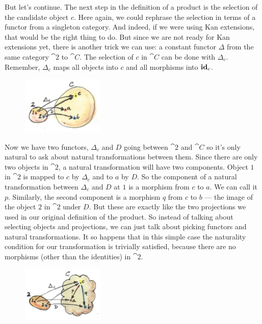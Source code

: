 \noindent
But let's continue. The next step in the definition of a product is the
selection of the candidate object $c$. Here again, we could
rephrase the selection in terms of a functor from a singleton category.
And indeed, if we were using Kan extensions, that would be the right
thing to do. But since we are not ready for Kan extensions yet, there is
another trick we can use: a constant functor $\Delta$ from the same category
$\cat{2}$ to $\cat{C}$. The selection of $c$ in $\cat{C}$ can be
done with $\Delta_c$. Remember, $\Delta_c$ maps all
objects into $c$ and all morphisms into $\idarrow[c]$.

\begin{figure}[H]
\centering
\includegraphics[width=0.35\textwidth]{images/twodelta.jpg}
\end{figure}

\noindent
Now we have two functors, $\Delta_c$ and $D$ going between
$\cat{2}$ and $\cat{C}$ so it's only natural to ask about natural
transformations between them. Since there are only two objects in
$\cat{2}$, a natural transformation will have two components. Object $1$
in $\cat{2}$ is mapped to $c$ by $\Delta_c$ and to
$a$ by $D$. So the component of a natural transformation between
$\Delta_c$ and $D$ at $1$ is a morphism from $c$ to
$a$. We can call it $p$. Similarly, the second component
is a morphism $q$ from $c$ to $b$ --- the image of
the object $2$ in $\cat{2}$ under $D$. But these are exactly like the two
projections we used in our original definition of the product. So
instead of talking about selecting objects and projections, we can just
talk about picking functors and natural transformations. It so happens
that in this simple case the naturality condition for our transformation
is trivially satisfied, because there are no morphisms (other than the
identities) in $\cat{2}$.

\begin{figure}[H]
\centering
\includegraphics[width=0.35\textwidth]{images/productcone.jpg}
\end{figure}


